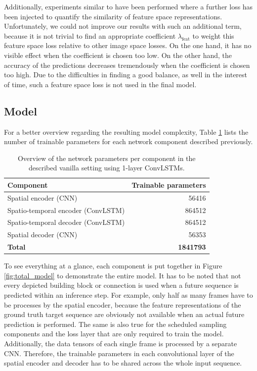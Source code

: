 Additionally, experiments similar to \parencite{gen_img_perc_sim} have been performed where a further loss has been injected to quantify the similarity of feature space representations. Unfortunately, we could not improve our results with such an additional term, because it is not trivial to find an appropriate coefficient $\lambda_{\textrm{feat}}$ to weight this feature space loss relative to other image space losses. On the one hand, it has no visible effect when the coefficient is chosen too low. On the other hand, the accuracy of the predictions decreases tremendously when the coefficient is chosen too high. Due to the difficulties in finding a good balance, as well in the interest of time, such a feature space loss is not used in the final model.


\subsection{Model}

For a better overview regarding the resulting model complexity, Table \ref{tab:model_params} lists the number of trainable parameters for each network component described previously.

\begin{table}[htpb]
  \small
  \centering
  \begin{tabular}{l r}
    \toprule
      \textbf{Component} & \textbf{Trainable parameters} \\
    \midrule
      Spatial encoder \scriptsize{(CNN)} & \num{56416} \\
      Spatio-temporal encoder \scriptsize{(ConvLSTM)} & \num{864512} \\
      Spatio-temporal decoder \scriptsize{(ConvLSTM)} & \num{864512} \\
      Spatial decoder \scriptsize{(CNN)} & \num{56353} \\
    \midrule
    \midrule
      \textbf{Total} & \textbf{\num{1841793}} \\
    \bottomrule
  \end{tabular}
  \caption[Model Parameters]{Overview of the network parameters per component in the described vanilla setting using 1-layer ConvLSTMs.}\label{tab:model_params}
\end{table}

To see everything at a glance, each component is put together in Figure \ref{fig:total_model} to demonstrate the entire model. It has to be noted that not every depicted building block or connection is used when a future sequence is predicted within an inference step. For example, only half as many frames have to be processes by the spatial encoder, because the feature representations of the ground truth target sequence are obviously not available when an actual future prediction is performed. The same is also true for the scheduled sampling components and the loss layer that are only required to train the model. Additionally, the data tensors of each single frame is processed by a separate CNN. Therefore, the trainable parameters in each convolutional layer of the spatial encoder and decoder has to be shared across the whole input sequence. 

